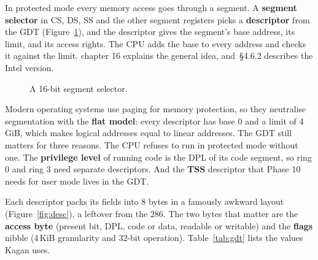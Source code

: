 \documentclass[11pt,a4paper]{article}
\begin{document}
In protected mode every memory access goes through a segment. A \textbf{segment selector} in CS, DS, SS and the
other segment registers picks a \textbf{descriptor} from the GDT (Figure~\ref{fig:selector}), and the descriptor
gives the segment's base address, its limit, and its access rights. The CPU adds the base to every address and checks
it against the limit. \OSTEP chapter 16 explains the general idea, and \OSDI\,\S4.6.2 describes the Intel version.

\begin{figure}[htbp]
\centering
{}
\caption{A 16-bit segment selector.}
\label{fig:selector}
\end{figure}

Modern operating systems use paging for memory protection, so they neutralise segmentation with the \textbf{flat
model}: every descriptor has base 0 and a limit of 4\,GiB, which makes logical addresses equal to linear addresses.
The GDT still matters for three reasons. The CPU refuses to run in protected mode without one. The \textbf{privilege
level} of running code is the DPL of its code segment, so ring 0 and ring 3 need separate descriptors. And the
\textbf{TSS} descriptor that Phase 10 needs for user mode lives in the GDT.

Each descriptor packs its fields into 8 bytes in a famously awkward layout (Figure~\ref{fig:desc}), a leftover from
the 286. The two bytes that matter are the \textbf{access byte} (present bit, DPL, code or data, readable or writable)
and the \textbf{flags} nibble (4\,KiB granularity and 32-bit operation). Table~\ref{tab:gdt} lists the values
Kagan uses.
\end{document}
